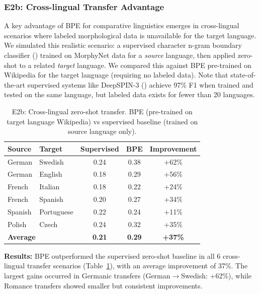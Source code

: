 \documentclass[11pt]{article}
\begin{document}
\subsubsection{E2b: Cross-lingual Transfer Advantage}

A key advantage of BPE for comparative linguistics emerges in cross-lingual scenarios where labeled morphological data is unavailable for the target language. We simulated this realistic scenario: a supervised character n-gram boundary classifier (\citealt{ruokolainen-etal-2013-supervised}) trained on MorphyNet data for a \textit{source} language, then applied zero-shot to a related \textit{target} language. We compared this against BPE pre-trained on Wikipedia for the target language (requiring no labeled data). Note that state-of-the-art supervised systems like DeepSPIN-3 (\citealt{peters-martins-2022-beyond}) achieve 97\% F1 when trained and tested on the same language, but labeled data exists for fewer than 20 languages.

\begin{table}[t]
\caption{E2b: Cross-lingual zero-shot transfer. BPE (pre-trained on target language Wikipedia) vs supervised baseline (trained on source language only).}
\label{tab:e2b_results}
\centering
\small
\begin{tabular}{llccc}
\toprule
\textbf{Source} & \textbf{Target} & \textbf{Supervised} & \textbf{BPE} & \textbf{Improvement} \\
\midrule
German & Swedish & 0.24 & 0.38 & +62\% \\
German & English & 0.18 & 0.29 & +56\% \\
French & Italian & 0.18 & 0.22 & +24\% \\
French & Spanish & 0.20 & 0.27 & +34\% \\
Spanish & Portuguese & 0.22 & 0.24 & +11\% \\
Polish & Czech & 0.24 & 0.32 & +35\% \\
\midrule
\multicolumn{2}{l}{\textbf{Average}} & \textbf{0.21} & \textbf{0.29} & \textbf{+37\%} \\
\bottomrule
\end{tabular}
\end{table}

\textbf{Results:} BPE outperformed the supervised zero-shot baseline in all 6 cross-lingual transfer scenarios (Table~\ref{tab:e2b_results}), with an average improvement of 37\%. The largest gains occurred in Germanic transfers (German$\to$Swedish: +62\%), while Romance transfers showed smaller but consistent improvements.
\end{document}
